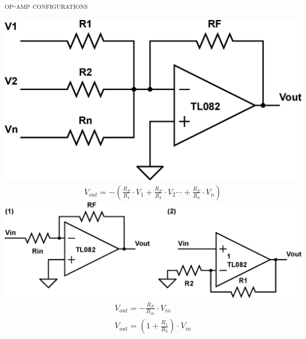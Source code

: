 \documentclass[10pt,letterpaper,english]{article}
\begin{document}
\textsc{op-amp configurations}\\
\begin{multicols}{2}
\includegraphics[scale=0.2]{opamp-1.eps}
\begin{align*}
V_{out} = -(\frac{R_F}{R_1}\cdot V_1 + \frac{R_F}{R_2}\cdot V_2 \cdots + \frac{R_F}{R_n}\cdot V_n)
\end{align*}
\includegraphics[scale=0.4]{opamp-2.eps}
\begin{align*}
V_{out} = -\frac{R_F}{R_{in}}\cdot V_{in} \tag*{(1) Inverting}\\
V_{out} = (1 + \frac{R_1}{R_2})\cdot V_{in} \tag*{(2) Non-inverting}\\
\end{align*}
\end{multicols}
\end{document}

